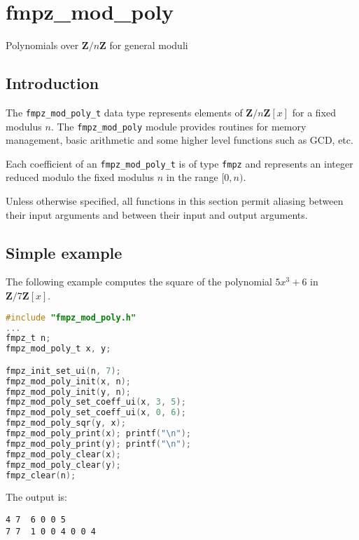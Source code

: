 \documentclass[a4paper,10pt]{book}
\newcommand{\Z}{\mathbf{Z}}%
\newcommand{\code}{\lstinline}
\begin{document}



\chapter{fmpz\_mod\_poly}
\epigraph{Polynomials over $\Z / n \Z$ for general moduli}{}

\section{Introduction}

The \code{fmpz_mod_poly_t} data type represents elements of $\Z/n\Z[x]$ for
a fixed modulus $n$. The \code{fmpz_mod_poly} module provides routines for 
memory management, basic arithmetic and some higher level functions
such as GCD, etc.

Each coefficient of an \code{fmpz_mod_poly_t} is of type \code{fmpz} 
and represents an integer reduced modulo the fixed modulus $n$ in the 
range $[0,n)$.

Unless otherwise specified, all functions in this section permit aliasing 
between their input arguments and between their input and output arguments.

\section{Simple example}

The following example computes the square of the polynomial $5x^3 + 6$
in $\Z/7\Z[x]$.
\begin{lstlisting}[language=c]
#include "fmpz_mod_poly.h"
...
fmpz_t n;
fmpz_mod_poly_t x, y;

fmpz_init_set_ui(n, 7);
fmpz_mod_poly_init(x, n);
fmpz_mod_poly_init(y, n);
fmpz_mod_poly_set_coeff_ui(x, 3, 5);
fmpz_mod_poly_set_coeff_ui(x, 0, 6);
fmpz_mod_poly_sqr(y, x);
fmpz_mod_poly_print(x); printf("\n");
fmpz_mod_poly_print(y); printf("\n");
fmpz_mod_poly_clear(x);
fmpz_mod_poly_clear(y);
fmpz_clear(n);
\end{lstlisting}

The output is:
\begin{lstlisting}
4 7  6 0 0 5
7 7  1 0 0 4 0 0 4
\end{lstlisting}
\end{document}
